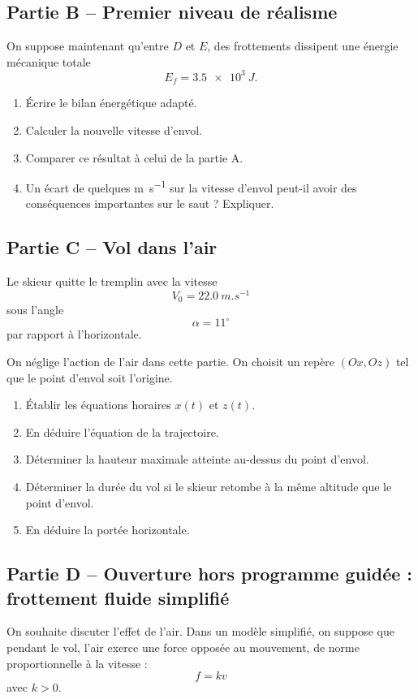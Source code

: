 \documentclass[11pt,a4paper]{article}
\begin{document}
\subsection*{Partie B -- Premier niveau de réalisme}
On suppose maintenant qu’entre $D$ et $E$, des frottements dissipent une énergie mécanique totale
\[
E_f=\SI{3,5e3}{J}.
\]

\begin{enumerate}[label=\textbf{3.\arabic*}, resume, leftmargin=1.6em]
    \item Écrire le bilan énergétique adapté.
    \item Calculer la nouvelle vitesse d’envol.
    \item Comparer ce résultat à celui de la partie A.
    \item Un écart de quelques \si{m.s^{-1}} sur la vitesse d’envol peut-il avoir des conséquences importantes sur le saut ? Expliquer.
\end{enumerate}

\subsection*{Partie C -- Vol dans l’air}
Le skieur quitte le tremplin avec la vitesse
\[
V_0=\SI{22,0}{m.s^{-1}}
\]
sous l’angle
\[
\alpha=11^\circ
\]
par rapport à l’horizontale.

On néglige l’action de l’air dans cette partie.  
On choisit un repère $(Ox,Oz)$ tel que le point d’envol soit l’origine.

\begin{enumerate}[label=\textbf{3.\arabic*}, resume, leftmargin=1.6em]
    \item Établir les équations horaires $x(t)$ et $z(t)$.
    \item En déduire l’équation de la trajectoire.
    \item Déterminer la hauteur maximale atteinte au-dessus du point d’envol.
    \item Déterminer la durée du vol si le skieur retombe à la même altitude que le point d’envol.
    \item En déduire la portée horizontale.
\end{enumerate}

\subsection*{Partie D -- Ouverture hors programme guidée : frottement fluide simplifié}
On souhaite discuter l’effet de l’air.  
Dans un modèle simplifié, on suppose que pendant le vol, l’air exerce une force opposée au mouvement, de norme proportionnelle à la vitesse :
\[
f=kv
\]
avec $k>0$.
\end{document}

